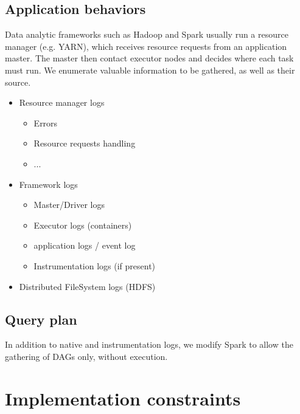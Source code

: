 \documentclass[12pt,twocolumn]{article}
\begin{document}
  \subsection{Application behaviors}
    Data analytic frameworks such as Hadoop and Spark usually run a resource manager (e.g. YARN),
    which receives resource requests from an application master. The master then contact executor
    nodes and decides where each task must run. We enumerate valuable information to be gathered,
    as well as their source.
    \begin{itemize}
      \item Resource manager logs
        \begin{itemize}
          \item Errors
          \item Resource requests handling
          \item ...
        \end{itemize}
      \item Framework logs
      \begin{itemize}
        \item Master/Driver logs
        \item Executor logs (containers)
        \item application logs / event log
        \item Instrumentation logs (if present)
      \end{itemize}
      \item Distributed FileSystem logs (HDFS)
    \end{itemize}

  \subsection{Query plan}
    In addition to native and instrumentation logs, we modify Spark to allow the gathering of
    DAGs only, without execution.

\section{Implementation constraints}
\end{document}
